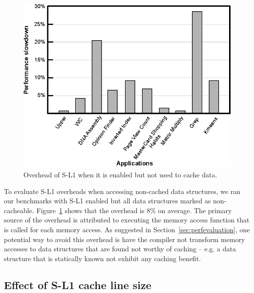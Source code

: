 \begin{figure}[t]
\center
\includegraphics[scale=0.82]{7cachingOverhead.eps}
\vspace{-0.0cm}
\caption{\footnotesize\textnormal{Overhead of S-L1 when it is enabled but not used to cache data.}}
\label{fig:sl1overhead}
\end{figure}



To evaluate S-L1 overheads when accessing non-cached data structures, we ran our benchmarks with S-L1 enabled but all
data structures marked as non-cacheable. Figure~\ref{fig:sl1overhead} shows that the overhead is 8\% on average.
The primary source of the overhead is attributed to executing the memory access function that is called for each memory access.
As suggested in Section~\ref{sec:perfevaluation}, one potential way to avoid this overhead is have the compiler not
transform memory accesses to data structures that are found not worthy of caching -- e.g. a data
structure that is statically known not exhibit any caching benefit.



\subsection{Effect of S-L1 cache line size}
\label{sec:cachelineeffect}



